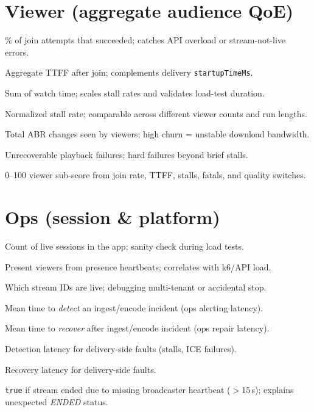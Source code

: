 \documentclass[10pt,a4paper]{article}
\newcommand{\metric}[2]{\item[\texttt{#1}] #2}
\begin{document}
\section*{Viewer (aggregate audience QoE)}
\begin{description}[style=nextline, leftmargin=2.6cm, labelwidth=2.4cm]
  \metric{joinSuccessRate}{\% of join attempts that succeeded; catches API overload or stream-not-live errors.}
  \metric{timeToPlayMs}{Aggregate TTFF after join; complements delivery \texttt{startupTimeMs}.}
  \metric{totalWatchMs}{Sum of watch time; scales stall rates and validates load-test duration.}
  \metric{stallEventsPerViewerHour}{Normalized stall rate; comparable across different viewer counts and run lengths.}
  \metric{qualitySwitchCount}{Total ABR changes seen by viewers; high churn = unstable download bandwidth.}
  \metric{fatalPlaybackErrors}{Unrecoverable playback failures; hard failures beyond brief stalls.}
  \metric{viewerHealthScore}{0--100 viewer sub-score from join rate, TTFF, stalls, fatals, and quality switches.}
\end{description}

\section*{Ops (session \& platform)}
\begin{description}[style=nextline, leftmargin=2.6cm, labelwidth=2.4cm]
  \metric{activeStreams}{Count of live sessions in the app; sanity check during load tests.}
  \metric{concurrentViewers}{Present viewers from presence heartbeats; correlates with k6/API load.}
  \metric{activeStreamIds}{Which stream IDs are live; debugging multi-tenant or accidental stop.}
  \metric{mttdMs}{Mean time to \emph{detect} an ingest/encode incident (ops alerting latency).}
  \metric{mttrMs}{Mean time to \emph{recover} after ingest/encode incident (ops repair latency).}
  \metric{deliveryMttdMs}{Detection latency for delivery-side faults (stalls, ICE failures).}
  \metric{deliveryMttrMs}{Recovery latency for delivery-side faults.}
  \metric{zombieStop}{\texttt{true} if stream ended due to missing broadcaster heartbeat ($>$15\,s); explains unexpected \emph{ENDED} status.}
\end{description}
\end{document}

